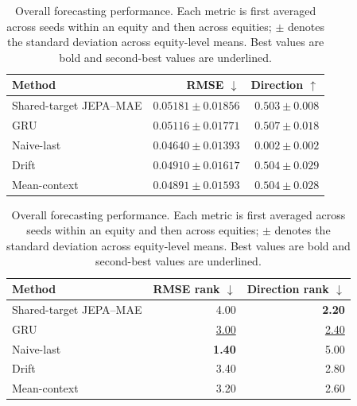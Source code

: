 \begin{table}[t]
\centering
\small
\caption{Overall forecasting performance. Each metric is first averaged across seeds within an equity and then across equities; $\pm$ denotes the standard deviation across equity-level means. Best values are bold and second-best values are underlined.}
\label{tab:main_metrics}
\begin{tabular}{lrr}
\toprule
Method & RMSE $\downarrow$ & Direction $\uparrow$ \\
\midrule
Shared-target JEPA--MAE & $0.05181 \pm 0.01856$ & $0.503 \pm 0.008$ \\
GRU & $0.05116 \pm 0.01771$ & \textbf{$0.507 \pm 0.018$} \\
Naive-last & \textbf{$0.04640 \pm 0.01393$} & $0.002 \pm 0.002$ \\
Drift & $0.04910 \pm 0.01617$ & \underline{$0.504 \pm 0.029$} \\
Mean-context & \underline{$0.04891 \pm 0.01593$} & \underline{$0.504 \pm 0.028$} \\
\bottomrule
\end{tabular}
\par\medskip
\begin{tabular}{lrr}
\toprule
Method & RMSE rank $\downarrow$ & Direction rank $\downarrow$ \\
\midrule
Shared-target JEPA--MAE & 4.00 & \textbf{2.20} \\
GRU & \underline{3.00} & \underline{2.40} \\
Naive-last & \textbf{1.40} & 5.00 \\
Drift & 3.40 & 2.80 \\
Mean-context & 3.20 & 2.60 \\
\bottomrule
\end{tabular}
\end{table}
